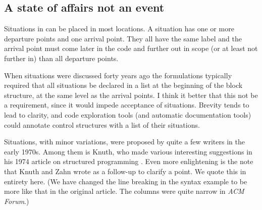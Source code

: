 \documentclass[10pt]{amsart}
\begin{document}
\subsection{A state of affairs not an event}

Situations in \Utop can be placed in most locations.  A situation has
one or more departure points and one arrival point.  They all have the
same label and the arrival point must come later in the code and
further out in scope (or at least not further in) than all departure
points.

When situations were discussed forty years ago the formulations
typically required that all situations be declared in a list at the
beginning of the block structure, at the same level as the arrival
points.  I think it better that this not be a requirement, since it
would impede acceptance of situations.  Brevity tends to lead to
clarity, and code exploration tools (and automatic documentation
tools) could annotate control structures with a list of their
situations.

Situations, with minor variations, were proposed by quite a few
writers in the early 1970s.  Among them is Knuth, who made various
interesting suggestions in his 1974 article on structured programming
\cite{KnuthDE74}.  Even more enlightening is the note \cite{KnuthDE75}
that Knuth and Zahn wrote as a follow-up to clarify a point.  We quote
this in entirety here.  (We have changed the line breaking in the
syntax example to be more like that in the original article.  The
columns were quite narrow in \emph{ACM Forum}.)
\end{document}
